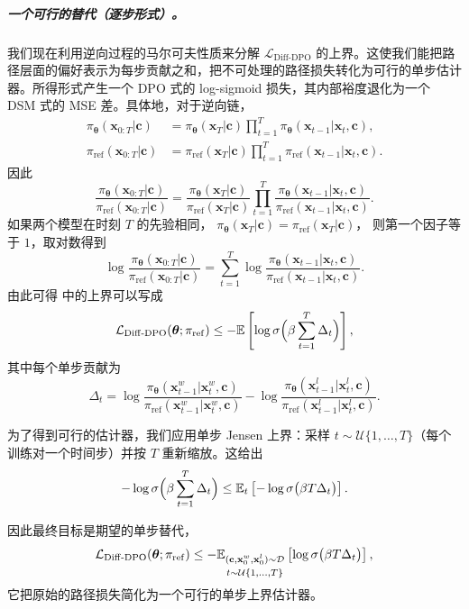 \subparagraph{一个可行的替代（逐步形式）。} 我们现在利用逆向过程的马尔可夫性质来分解 $\mathcal L_{\mathrm{Diff\text{-}DPO}}$ 的上界。这使我们能把路径层面的偏好表示为每步贡献之和，把不可处理的路径损失转化为可行的单步估计器。所得形式产生一个 DPO 式的 log-sigmoid 损失，其内部裕度退化为一个 DSM 式的 MSE 差。具体地，对于逆向链，
\begin{align*}
    \pi_{\bm\theta}(\mathbf x_{0:T}| \mathbf c)
&=\pi_{\bm\theta}(\mathbf x_T| \mathbf c) \prod_{t=1}^{T}
\pi_{\bm\theta}(\mathbf x_{t-1}| \mathbf x_t,\mathbf c),
\\
\pi_{\mathrm{ref}}(\mathbf x_{0:T}| \mathbf c)
&=\pi_{\mathrm{ref}}(\mathbf x_T| \mathbf c) \prod_{t=1}^{T}
\pi_{\mathrm{ref}}(\mathbf x_{t-1}| \mathbf x_t,\mathbf c).
\end{align*}
因此
\[
\frac{\pi_{\bm\theta}(\mathbf x_{0:T}| \mathbf c)}{\pi_{\mathrm{ref}}(\mathbf x_{0:T}| \mathbf c)}
=
\frac{\pi_{\bm\theta}(\mathbf x_T| \mathbf c)}{\pi_{\mathrm{ref}}(\mathbf x_T| \mathbf c)}
\prod_{t=1}^{T}
\frac{\pi_{\bm\theta}(\mathbf x_{t-1}| \mathbf x_t,\mathbf c)}
     {\pi_{\mathrm{ref}}(\mathbf x_{t-1}| \mathbf x_t,\mathbf c)}.
\]
如果两个模型在时刻 $T$ 的先验相同，
$\pi_{\bm\theta}(\mathbf x_T| \mathbf c)=\pi_{\mathrm{ref}}(\mathbf x_T| \mathbf c)$，
则第一个因子等于 $1$，取对数得到
\[
\log\frac{\pi_{\bm\theta}(\mathbf x_{0:T}| \mathbf c)}{\pi_{\mathrm{ref}}(\mathbf x_{0:T}| \mathbf c)}
=\sum_{t=1}^{T}
\log\frac{\pi_{\bm\theta}(\mathbf x_{t-1}| \mathbf x_t,\mathbf c)}
         {\pi_{\mathrm{ref}}(\mathbf x_{t-1}| \mathbf x_t,\mathbf c)}.
\]
由此可得  中的上界可以写成
\[
\mathcal L_{\mathrm{Diff\text{-}DPO}}(\bm\theta;\pi_{\mathrm{ref}})
  \le  - \mathbb{E} \left[\log\sigma \Big(\beta \sum_{t=1}^T \Delta_t\Big)\right],
\]
其中每个单步贡献为
\[
\Delta_t
= \log\frac{\pi_{\bm\theta}(\mathbf x^w_{t-1}|\mathbf x^w_t,\mathbf c)}
               {\pi_{\mathrm{ref}}(\mathbf x^w_{t-1}|\mathbf x^w_t,\mathbf c)}
- \log\frac{\pi_{\bm\theta}(\mathbf x^l_{t-1}|\mathbf x^l_t,\mathbf c)}
               {\pi_{\mathrm{ref}}(\mathbf x^l_{t-1}|\mathbf x^l_t,\mathbf c)}.
\]

为了得到可行的估计器，我们应用单步 Jensen 上界：采样
$t\sim\mathcal U\{1,\dots,T\}$（每个训练对一个时间步）并按 $T$ 重新缩放。这给出
\[
-\log\sigma \Big(\beta \sum_{t=1}^T \Delta_t\Big)
 \le  \mathbb{E}_{t} \left[-\log\sigma \big(\beta T \Delta_t\big)\right].
\]

因此最终目标是期望的单步替代，
\[
\mathcal L_{\mathrm{Diff\text{-}DPO}}(\bm\theta;\pi_{\mathrm{ref}})
 \le
- \mathbb{E}_{\substack{(\mathbf c,\mathbf x_0^w,\mathbf x_0^l)\sim\mathcal D \\[2pt] t\sim \mathcal U\{1,\dots,T\}}}
\left[\log\sigma \big(\beta T  \Delta_t\big)\right],
\]
它把原始的路径损失简化为一个可行的单步上界估计器。

